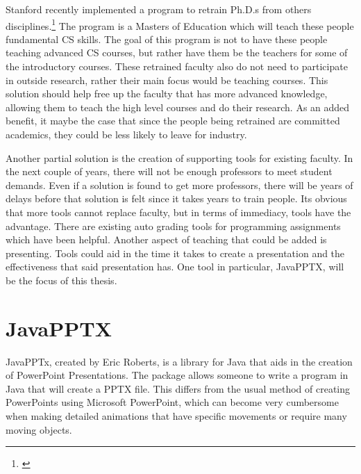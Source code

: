 \documentclass[12pt,twoside]{reedthesis}
\begin{document}
Stanford recently implemented a program to retrain Ph.D.s from others disciplines.\footnote{\cite{starkman_stanford_0400}} The program is a Masters of Education which will teach these people fundamental CS skills. The goal of this program is not to have these people teaching advanced CS courses, but rather have them be the teachers for some of the introductory courses. These retrained faculty also do not need to participate in outside research, rather their main focus would be teaching courses. This solution should help free up the faculty that has more advanced knowledge, allowing them to teach the high level courses and do their research. As an added benefit, it maybe the case that since the people being retrained are committed academics, they could be less likely to leave for industry. 

Another partial solution is the creation of supporting tools for existing faculty. In the next couple of years, there will not be enough professors to meet student demands. Even if a solution is found to get more professors, there will be years of delays before that solution is felt since it takes years to train people. Its obvious that more tools cannot replace faculty, but in terms of immediacy, tools have the advantage. There are existing auto grading tools for programming assignments which have been helpful. Another aspect of teaching that could be added is presenting. Tools could aid in the time it takes to create a presentation and the effectiveness that said presentation has. One tool in particular, JavaPPTX, will be the focus of this thesis.


\section{JavaPPTX}
JavaPPTx, created by Eric Roberts, is a library for Java that aids in the creation of PowerPoint Presentations. The package allows someone to write a program in Java that will create a PPTX file. This differs from the usual method of creating PowerPoints using Microsoft PowerPoint, which can become very cumbersome when making detailed animations that have specific movements or require many moving objects. 
\end{document}
